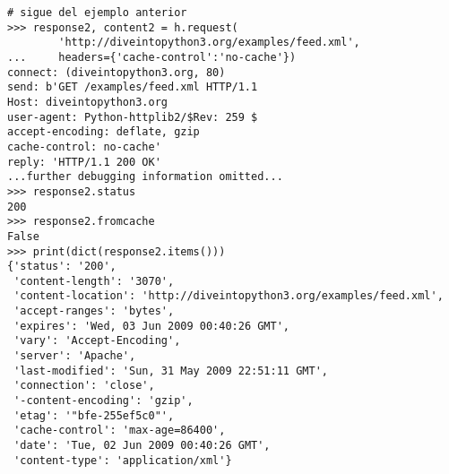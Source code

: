 \noindent\begin{minipage}{\textwidth}
\begin{lstlisting}[mathescape=True]
# sigue del ejemplo anterior
>>> response2, content2 = h.request(
        'http://diveintopython3.org/examples/feed.xml',
...     headers={'cache-control':'no-cache'})
connect: (diveintopython3.org, 80)        
send: b'GET /examples/feed.xml HTTP/1.1
Host: diveintopython3.org
user-agent: Python-httplib2/$Rev: 259 $
accept-encoding: deflate, gzip
cache-control: no-cache'
reply: 'HTTP/1.1 200 OK'
...further debugging information omitted...
>>> response2.status
200
>>> response2.fromcache                  
False
>>> print(dict(response2.items()))      
{'status': '200',
 'content-length': '3070',
 'content-location': 'http://diveintopython3.org/examples/feed.xml',
 'accept-ranges': 'bytes',
 'expires': 'Wed, 03 Jun 2009 00:40:26 GMT',
 'vary': 'Accept-Encoding',
 'server': 'Apache',
 'last-modified': 'Sun, 31 May 2009 22:51:11 GMT',
 'connection': 'close',
 '-content-encoding': 'gzip',
 'etag': '"bfe-255ef5c0"',
 'cache-control': 'max-age=86400',
 'date': 'Tue, 02 Jun 2009 00:40:26 GMT',
 'content-type': 'application/xml'}
\end{lstlisting}
\end{minipage}


